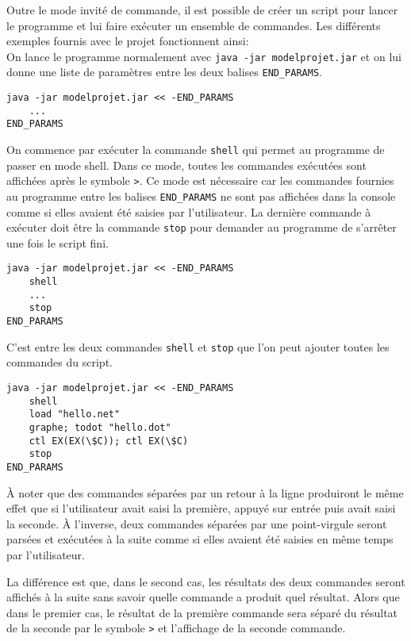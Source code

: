 \documentclass[dvipsnames]{report}
\begin{document}
Outre le mode invité de commande, il est possible de créer un script pour lancer le programme et lui faire exécuter un ensemble de commandes. Les différents exemples fournis avec le projet fonctionnent ainsi:\\

On lance le programme normalement avec \texttt{java -jar modelprojet.jar} et on lui donne une liste de paramètres entre les deux balises \texttt{END\_PARAMS}.
\begin{verbatim}
java -jar modelprojet.jar << -END_PARAMS
    ...
END_PARAMS
\end{verbatim}

On commence par exécuter la commande \texttt{shell} qui permet au programme de passer en mode shell. Dans ce mode, toutes les commandes exécutées sont affichées après le symbole \texttt{>}. Ce mode est nécessaire car les commandes fournies au programme entre les balises \texttt{END\_PARAMS} ne sont pas affichées dans la console comme si elles avaient été saisies par l'utilisateur. La dernière commande à exécuter doit être la commande \texttt{stop} pour demander au programme de s'arrêter une fois le script fini.

\begin{verbatim}
java -jar modelprojet.jar << -END_PARAMS
    shell
    ...
    stop
END_PARAMS
\end{verbatim}

C'est entre les deux commandes \texttt{shell} et \texttt{stop} que l'on peut ajouter toutes les commandes du script.

\begin{verbatim}
java -jar modelprojet.jar << -END_PARAMS
    shell
    load "hello.net"
    graphe; todot "hello.dot"
    ctl EX(EX(\$C)); ctl EX(\$C)
    stop
END_PARAMS
\end{verbatim}

\`{A} noter que des commandes séparées par un retour à la ligne produiront le même effet que si l'utilisateur avait saisi la première, appuyé sur entrée puis avait saisi la seconde. \`{A} l'inverse, deux commandes séparées par une point-virgule seront parsées et exécutées à la suite comme si elles avaient été saisies en même temps par l'utilisateur.

La différence est que, dans le second cas, les résultats des deux commandes seront affichés à la suite sans savoir quelle commande a produit quel résultat. Alors que dans le premier cas, le résultat de la première commande sera séparé du résultat de la seconde par le symbole \texttt{>} et l'affichage de la seconde commande.
\end{document}
